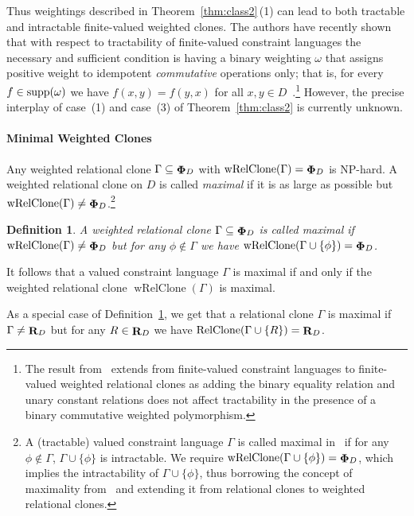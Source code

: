 \documentclass[11pt, reqno]{article}
\DeclareMathOperator{\rel}{{\bf R}}
\DeclareMathOperator{\wrel}{{\bf \Phi}}
\DeclareMathOperator{\supp}{{\rm supp}}
\DeclareMathOperator{\wrelclone}{wRelClone}
\DeclareMathOperator{\relclone}{RelClone}
\newtheorem{definition}{Definition}
\theoremstyle{remark}
\begin{document}
Thus weightings described in Theorem~\ref{thm:class2}\,(1) can lead to both
tractable and intractable finite-valued weighted clones. 
%
The authors have recently shown that with respect to tractability of
finite-valued constraint languages the necessary and sufficient condition is
having a binary weighting $\omega$ that assigns positive weight to idempotent
\emph{commutative} operations only; that is, for every $f\in\supp(\omega)$ we
have $f(x,y)=f(y,x)$ for all $x,y\in D$~\cite{tz13:stoc}.\footnote{The result
from~\cite{tz13:stoc} extends from finite-valued constraint languages to
finite-valued weighted relational clones as adding the binary equality relation
and unary constant relations does not affect tractability in the presence of a
binary commutative weighted polymorphism.}
%
However, the precise interplay of case~(1) and case~(3) of
Theorem~\ref{thm:class2} is currently unknown. 



\paragraph{Minimal Weighted Clones}

Any weighted relational clone $\Gamma\subseteq\wrel_D$ with
$\wrelclone(\Gamma)=\wrel_D$ is NP-hard. 
%
A weighted relational clone on $D$ is called \emph{maximal} if it is as large as
possible but $\wrelclone(\Gamma)\neq\wrel_D$.\footnote{A (tractable) valued
constraint language $\Gamma$ is called maximal in~\cite{Cohen06:complexitysoft}
if for any $\phi\not\in\Gamma$, $\Gamma\cup\{\phi\}$ is intractable. We require
$\wrelclone(\Gamma\cup\{\phi\})=\wrel_D$, which implies the intractability of
$\Gamma\cup\{\phi\}$, thus borrowing the concept of maximality
from~\cite{Bulatov01:complexity,Bulatov04:graph,Jonsson08:siam,Bodirsky09:tcs}
and extending it from relational clones to weighted relational clones.} 

\begin{definition}\label{def:maximal}
A weighted relational clone $\Gamma\subseteq\wrel_D$ is called \emph{maximal}
if $\wrelclone(\Gamma)\neq\wrel_D$ but for any $\phi\not\in\Gamma$ we have
$\wrelclone(\Gamma\cup\{\phi\})=\wrel_D$. 
\end{definition}

It follows that a valued constraint language $\Gamma$ is maximal if and only if
the weighted relational clone $\wrelclone(\Gamma)$ is maximal.

As a special case of Definition~\ref{def:maximal}, we get that a relational clone
$\Gamma$ is maximal if $\Gamma\neq\rel_D$ but for any $R\in\rel_D$ we have
$\relclone(\Gamma\cup\{R\})=\rel_D$.
\end{document}
